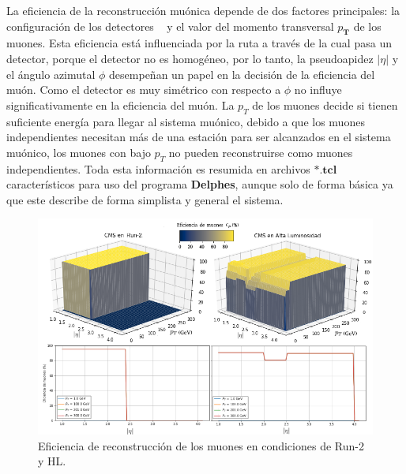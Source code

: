 La eficiencia de la reconstrucción muónica depende de dos factores principales: la configuración de los detectores \CMS ~ y el valor del  momento transversal $p_\mathbf{T}$ de los muones. Esta eficiencia está influenciada por la ruta a través de la cual pasa un detector, porque el detector no es homogéneo, por lo tanto, la pseudoapidez $|\eta|$ y el ángulo azimutal $\phi$ desempeñan un papel en la decisión de la eficiencia del muón. Como el detector es muy simétrico con respecto a $\phi$ no influye significativamente en la eficiencia del muón. La $p_T$ de los muones decide si tienen suficiente energía para llegar al sistema muónico, debido a que los muones independientes necesitan más de una estación para ser alcanzados en el sistema muónico, los muones con bajo $p_T$ no pueden reconstruirse como muones independientes. Toda esta información es resumida en archivos $\mathbf{*.tcl}$ característicos para uso del programa \textbf{Delphes}, aunque solo de forma básica ya que este describe de forma simplista y general el sistema.

\begin{figure}[!t]
\centering
\includegraphics[width=1\textwidth]{Cap2/imagenes/Eficiencia_of_Muon.png}
\caption{Eficiencia de reconstrucción de los muones en condiciones de Run-2 y HL.}
\label{Compara_eficiencia_muon}
\end{figure}












